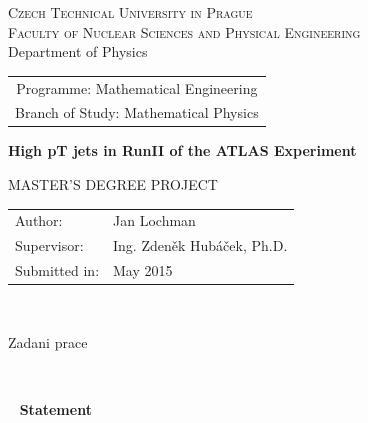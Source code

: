 \documentclass[a4paper,11pt]{report}
\newcommand{\cvut}{Czech Technical University in Prague}
\newcommand{\fjfi}{Faculty of Nuclear Sciences and Physical Engineering}
\newcommand{\km}{Department of Physics}
\newcommand{\obor}{Mathematical Engineering}
\newcommand{\zamereni}{Mathematical Physics}
\newcommand{\nazeven}{High pT jets in RunII of the ATLAS Experiment}
\newcommand{\autor}{Jan Lochman}
\newcommand{\rok}{May 2015}
\newcommand{\vedouci}{Ing. Zden\v{e}k Hub\'{a}\v{c}ek, Ph.D.}
\begin{document}
\thispagestyle{empty}

\begin{center}
    {\Large \textsc{\cvut}\\[1.5ex] \textsc{\fjfi}}\\[1.5ex]{\large \textsc \km}
    \vspace{10mm}

    \begin{tabular}{c}
    {Programme: \obor}\\
    {Branch of Study: \zamereni}
    \end{tabular}

    \vspace{10mm} \epsfysize=25mm  \epsfysize=25mm  \vspace{15mm}

   {\huge \bf \nazeven}

   \vspace{15mm}
   {\Large MASTER'S DEGREE PROJECT}

   \vfill
   {\large
    \begin{tabular}{ll}
    Author: & \autor\\
    Supervisor: & \vedouci\\
    Submitted in: & \rok
    \end{tabular}
   }
\end{center}


\newpage  
\thispagestyle{empty} 
~


\newpage  
\thispagestyle{empty} 
Zadani prace


\newpage  
\thispagestyle{empty} 
~


\newpage 
\thispagestyle{empty}  
~
\vfill 
{\bf Statement} 
\end{document}
